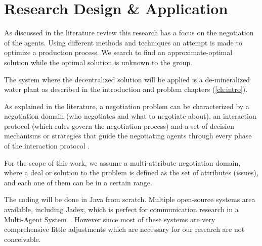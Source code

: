 \chapter{Research Design \& Application}
\label{ch:design}
As discussed in the literature review this research has a focus on the negotiation of the agents. Using different methods and techniques an attempt is made to optimize a production process. We search to find an approximate-optimal solution while the optimal solution is unknown to the group. %

The system where the  decentralized solution will be applied is a de-mineralized water plant as described in the introduction and problem chapters (\cref{ch:intro}).

As explained in the literature, a negotiation problem can be characterized by a negotiation domain (who negotiates and what to negotiate about), an interaction protocol (which rules govern the negotiation process) and a set of decision mechanisms or strategies that guide the negotiating agents through every phase of the interaction protocol \cite{fatima2014principles}.

For the scope of this work, we assume a multi-attribute negotiation domain, where a deal or solution to the problem is defined as the set of attributes (issues), and each one of them can be in a certain range.

The coding will be done in Java from scratch. Multiple open-source systems area available, including Jadex, which is perfect for communication research in a Multi-Agent System~\cite{kravari2015survey}. However since most of these systems are very comprehensive little adjustments which are necessary for our research are not conceivable.

